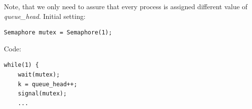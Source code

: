 Note, that we only need to assure that every process is assigned different value of \emph{queue\_head}.
Initial setting:
\begin{verbatim}
Semaphore mutex = Semaphore(1);
\end{verbatim}
Code:
\begin{verbatim}
while(1) {
    wait(mutex);
    k = queue_head++;
    signal(mutex);
    ...
\end{verbatim}
